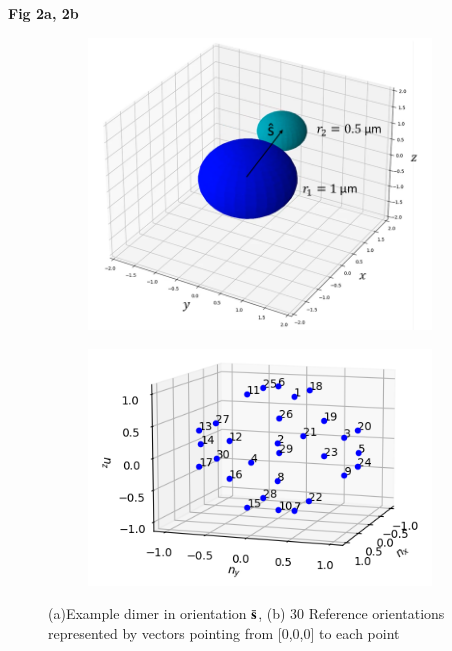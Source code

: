 \documentclass[final,  3p]{elsarticle}
\begin{document}
\begin{center}
	\bf{Fig 2a, 2b}
\end{center}
\begin{figure}[h]
	\centering
	\begin{subfigure}{0.49\textwidth}
		\subcaption{}
		\includegraphics[width=\textwidth]{./Images/fig2a.png}
	\end{subfigure}
	\begin{subfigure}{0.49\textwidth}
		\subcaption{}
		\includegraphics[width=\textwidth]{./Images/fig2b.png}
	\end{subfigure}
	\caption{(a)Example dimer in orientation $\bar{\bf s}$, (b) 30 Reference orientations represented by vectors pointing from [0,0,0] to each point}
	\label{fig:dimer}
\end{figure}
\end{document}
